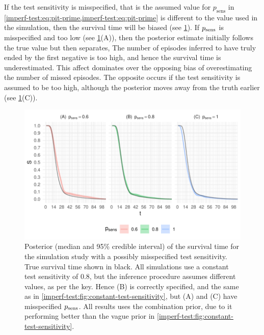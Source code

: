 \documentclass[thesis.tex]{subfiles}
\begin{document}
If the test sensitivity is misspecified, that is the assumed value for $p_\text{sens}$ in \cref{imperf-test:eq:pit-prime,imperf-test:eq:pit-prime} is different to the value used in the simulation, then the survival time will be biased (see \cref{imperf-test:fig:misspecified-test-sensitivity}).
If $p_\text{sens}$ is misspecified and too low (see \cref{imperf-test:fig:misspecified-test-sensitivity}(A)), then the posterior estimate initially follows the true value but then separates,
The number of episodes inferred to have truly ended by the first negative is too high, and hence the survival time is underestimated.
This affect dominates over the opposing bias of overestimating the number of missed episodes.
The opposite occurs if the test sensitivity is assumed to be too high, although the posterior moves away from the truth earlier (see \cref{imperf-test:fig:misspecified-test-sensitivity}(C)).
\begin{figure}
    \includegraphics[width=\textwidth]{cis-imperfect-testing/sim-misspecified-sensitivity}
  \caption[Simulation study results with misspecified test sensitivity]{%
    Posterior (median and 95\% credible interval) of the survival time for the simulation study with a possibly misspecified test sensitivity.
    True survival time shown in black.
    All simulations use a constant test sensitivity of 0.8, but the inference procedure assumes different values, as per the key.
    Hence (B) is correctly specified, and the same as in \cref{imperf-test:fig:constant-test-sensitivity}, but (A) and (C) have misspecified $p_\text{sens}$.
    All results uses the combination prior, due to it performing better than the vague prior in \cref{imperf-test:fig:constant-test-sensitivity}.
  }
  \label{imperf-test:fig:misspecified-test-sensitivity}
\end{figure}
\end{document}
